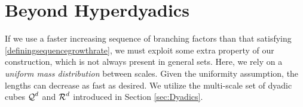 
\section{Beyond Hyperdyadics}

If we use a faster increasing sequence of branching factors than that satisfying \eqref{definingsequencegrowthrate}, we must exploit some extra property of our construction, which is not always present in general sets. Here, we rely on a \emph{uniform mass distribution} between scales. Given the uniformity assumption, the lengths can decrease as fast as desired. We utilize the multi-scale set of dyadic cubes $\operatorname{\mathcal{Q}}^d$ and $\operatorname{\mathcal{R}}^d$ introduced in Section \ref{sec:Dyadics}.

